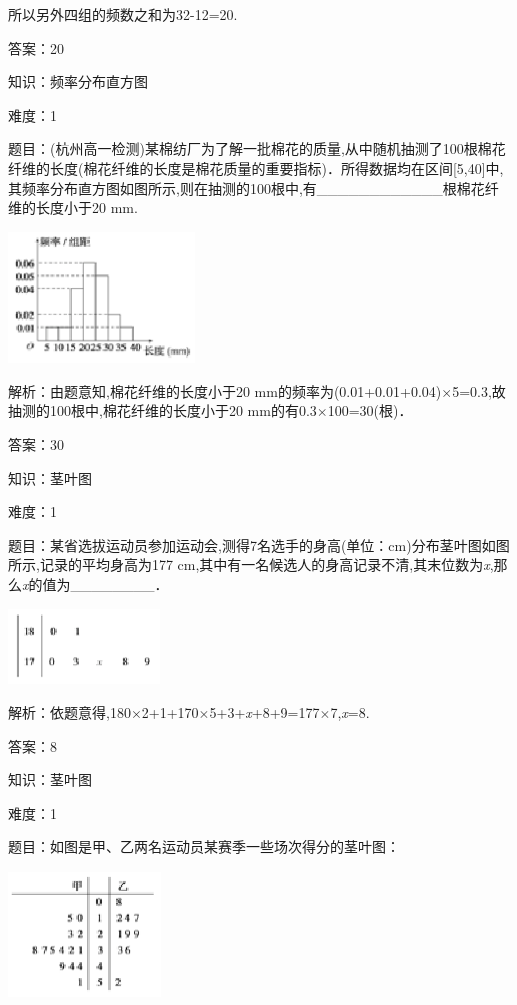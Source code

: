 \documentclass{article} %
\begin{document}
所以另外四组的频数之和为32-12=20.

答案：20

知识：频率分布直方图

难度：1

题目：(杭州高一检测)某棉纺厂为了解一批棉花的质量,从中随机抽测了100根棉花纤维的长度(棉花纤维的长度是棉花质量的重要指标)．所得数据均在区间[5,40]中,其频率分布直方图如图所示,则在抽测的100根中,有\_\_\_\_\_\_\_\_\_\_\_\_根棉花纤维的长度小于20 mm.

\includegraphics*[width=1.95in, height=1.37in, keepaspectratio=false]{image85}

解析：由题意知,棉花纤维的长度小于20 mm的频率为(0.01+0.01+0.04)$\mathrm{\times}$5=0.3,故抽测的100根中,棉花纤维的长度小于20 mm的有0.3$\mathrm{\times}$100=30(根)．

答案：30

知识：茎叶图

难度：1

题目：某省选拔运动员参加运动会,测得7名选手的身高(单位：cm)分布茎叶图如图所示,记录的平均身高为177 cm,其中有一名候选人的身高记录不清,其末位数为\textit{x},那么\textit{x}的值为\_\_\_\_\_\_\_\_．

\includegraphics*[width=1.59in, height=0.79in, keepaspectratio=false]{image86}

解析：依题意得,180$\mathrm{\times}$2+1+170$\mathrm{\times}$5+3+\textit{x}+8+9=177$\mathrm{\times}$7,\textit{x}=8.

答案：8

知识：茎叶图

难度：1

题目：如图是甲、乙两名运动员某赛季一些场次得分的茎叶图：

\includegraphics*[width=1.59in, height=1.32in, keepaspectratio=false]{image87}
\end{document}
